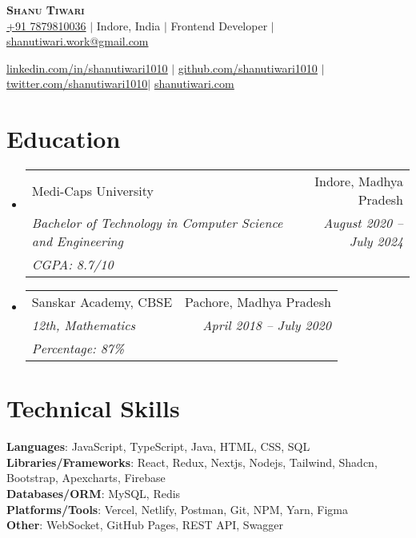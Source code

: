 \documentclass[letterpaper,10pt]{article}
\makeatletter
\newcommand{\resumeEduheading}[5]{
    \vspace{2pt}\item
      \begin{tabular*}{0.97\textwidth}[t]{l@{\extracolsep{\fill}}r}
        {#1} & #2 \\
        \textit{\small#3} & \textit{\small #4}\\
        \textit{\small#5} \\
      \end{tabular*}\vspace{-7pt}
  }
\newcommand{\resumeSubHeadingListStart}{\begin{itemize}[leftmargin=0.15in, label={}]}
\newcommand{\resumeSubHeadingListEnd}{\end{itemize}}
\makeatother
\begin{document}

\begin{center}
  \textbf{\Huge \scshape Shanu Tiwari} \\ \vspace{1pt}
  \href{tel:7879810036}{+91 7879810036} $|$
  {Indore, India} $|$
  {Frontend Developer} $|$
  \href{mailto:shanutiwari.work@gmail.com}{shanutiwari.work@gmail.com} \\ \vspace{1pt}

  \href{https://linkedin.com/in/shanutiwari1010}{\underline{linkedin.com/in/shanutiwari1010}} $|$
  \href{https://github.com/shanutiwari1010}{\underline{github.com/shanutiwari1010}} $|$
  \href{https://twitter.com/shanutiwari1010}{\underline{twitter.com/shanutiwari1010}}$|$
   \href{https://shanutiwari.com/}{\underline{shanutiwari.com}} 
  
\end{center}

\section{Education}
\resumeSubHeadingListStart
\resumeEduheading
{Medi-Caps University}{Indore, Madhya Pradesh}
{Bachelor of Technology in Computer Science and Engineering}{August 2020 -- July 2024}
{CGPA: 8.7/10}
\resumeEduheading
{Sanskar Academy, CBSE}{Pachore, Madhya Pradesh}
{12th, Mathematics}{April 2018 -- July 2020}
{Percentage: 87\%}
\resumeSubHeadingListEnd

\section{Technical Skills}
\begin{itemize}[leftmargin=0.15in, label={}]
  \small{\item{
        \textbf{Languages}{: \hfill JavaScript, TypeScript, Java, HTML, CSS, SQL \hfill} \\
        \vspace{3pt}\textbf{Libraries/Frameworks}{: \hfill React, Redux, Nextjs, Nodejs, Tailwind, Shadcn, Bootstrap, Apexcharts, Firebase \hfill} \\
        \vspace{3pt}\textbf{Databases/ORM}{: \hfill MySQL, Redis \hfill} \\
        \vspace{3pt}\textbf{Platforms/Tools}{: \hfill Vercel, Netlify, Postman, Git, NPM, Yarn, Figma \hfill} \\
        \vspace{3pt}\textbf{Other}{: \hfill WebSocket, GitHub Pages, REST API, Swagger \hfill} \\
        }}
\end{itemize}
\end{document}
